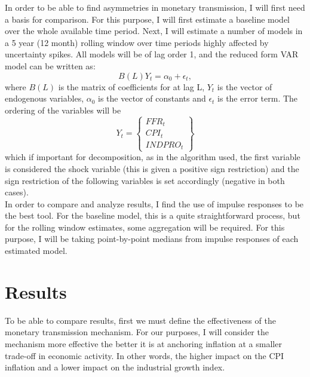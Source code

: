 \documentclass[12pt,a4paper]{article}
\begin{document}
In order to be able to find asymmetries in monetary transmission, I will first need a basis for comparison. For this purpose, I will first estimate a baseline model over the whole available time period. Next, I will estimate a number of models in a 5 year (12 month) rolling window over time periods highly affected by uncertainty spikes. All models will be of lag order 1, and the reduced form VAR model can be written as:
\begin{equation}
	B(L)Y_{t} = \alpha_{0} + \epsilon_{t},
\end{equation}
where  $B(L)$ is the matrix of coefficients for at lag L, $Y_{t}$ is the vector of endogenous variables, $\alpha_{0}$ is the vector of constants and $\epsilon_{t}$ is the error term. The ordering of the variables will be
\begin{equation}
	Y_{t} = 
	\begin{Bmatrix}
		FFR_{t} \\
		CPI_{t} \\
		INDPRO_{t}
	\end{Bmatrix}
\end{equation}
\noindent which if important for decomposition, as in the algorithm used, the first variable is considered the shock variable (this is given a positive sign restriction) and the sign restriction of the following variables is set accordingly (negative in both cases).\\

In order to compare and analyze results, I find the use of impulse responses to be the best tool. For the baseline model, this is a quite straightforward process, but for the rolling window estimates, some aggregation will be required. For this purpose, I will be taking point-by-point medians from impulse responses of each estimated model.

\section{Results}
To be able to compare results, first we must define the effectiveness of the monetary transmission mechanism. For our purposes, I will consider the mechanism more effective the better it is at anchoring inflation at a smaller trade-off in economic activity. In other words, the higher impact on the CPI inflation and a lower impact on the industrial growth index.\\
\end{document}

